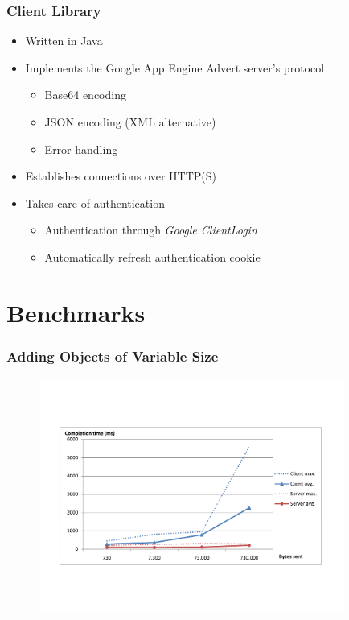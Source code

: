 \documentclass{beamer}
\begin{document}
\frame
{
	\frametitle{Client Library}
	\begin{itemize}
		\item Written in Java
		\item Implements the Google App Engine Advert server's protocol
		\begin{itemize}
			\item Base64 encoding
			\item JSON encoding (XML alternative)
			\item Error handling 
        \end{itemize}
        \item Establishes connections over HTTP(S)
		\item Takes care of authentication
		\begin{itemize}
			\item Authentication through \emph{Google ClientLogin}
			\item Automatically refresh authentication cookie
		\end{itemize} 
	\end{itemize}
}

\section{Benchmarks}
\frame
{
	\frametitle{Adding Objects of Variable Size}
	\begin{figure}[t]
	\begin{center}
	\includegraphics[trim=4cm 4cm 4cm 5cm, width=10cm]{add_obj.pdf} 
	\end{center}
	\end{figure}
}
\end{document}
